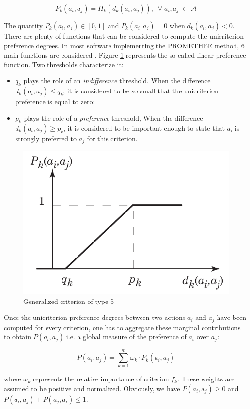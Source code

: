 \documentclass{svmult}
\begin{document}
$$
P_k(a_i,a_j) = H_k(d_k(a_i,a_j)), \; \; \forall \; a_i, a_j \; \in \; \mathcal{A}
$$

The quantity $P_k(a_i,a_j) \in [0, 1]$ and $P_k(a_i,a_j)=0$ when $d_k(a_i,a_j) <0$. There are plenty of functions that can be considered to compute the unicriterion preference degrees. In most software implementing the PROMETHEE method, $6$ main functions are considered \cite{Hayez}. Figure \ref{fig:criterion5} represents the so-called linear preference function. Two thresholds characterize it:
\begin{itemize}
\item $q_k$ plays the role of an \textit{indifference} threshold. When the difference $d_k(a_i,a_j) \leq q_k$, it is considered to be so small that the unicriterion preference is equal to zero;
\item $p_k$ plays the role of a \textit{preference} threshold, When the difference $d_k(a_i,a_j) \geq p_k$, it is considered to be important enough to state that $a_i$ is strongly preferred to $a_j$ for this criterion.
\end{itemize}

\begin{figure}[h!]
\begin{center}
\includegraphics[width=0.7\linewidth]{criterion5.pdf}
\end{center}
\caption{Generalized criterion of type 5}
\label{fig:criterion5}
\end{figure}

Once the unicriterion preference degrees between two actions $a_i$ and $a_j$ have been computed for every criterion, one has to aggregate these marginal contributions to obtain $P(a_i,a_j)$  i.e. a global measure of the preference of $a_i$ over $a_j$:

$$
P(a_i,a_j)= \sum_{k=1}^{m} \omega_k \cdot P_k(a_i,a_j)
$$

where $\omega_k$ represents the relative importance of criterion $f_k$. These weights are assumed to be positive and normalized. Obviously, we have $P(a_i,a_j) \geq 0$ and $P(a_i,a_j) + P(a_j,a_i) \leq 1$.\
\end{document}
